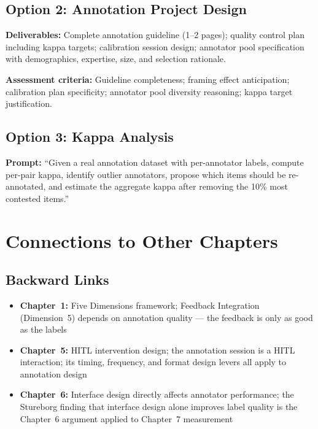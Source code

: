 \subsection{Option 2: Annotation Project Design}

\textbf{Deliverables:} Complete annotation guideline (1--2 pages); quality control plan including kappa targets; calibration session design; annotator pool specification with demographics, expertise, size, and selection rationale.

\textbf{Assessment criteria:} Guideline completeness; framing effect anticipation; calibration plan specificity; annotator pool diversity reasoning; kappa target justification.

\subsection{Option 3: Kappa Analysis}

\textbf{Prompt:} ``Given a real annotation dataset with per-annotator labels, compute per-pair kappa, identify outlier annotators, propose which items should be re-annotated, and estimate the aggregate kappa after removing the 10\% most contested items.''

\section{Connections to Other Chapters}

\subsection{Backward Links}
\begin{itemize}
    \item \textbf{Chapter~1:} Five Dimensions framework; Feedback Integration (Dimension~5) depends on annotation quality --- the feedback is only as good as the labels
    \item \textbf{Chapter~5:} HITL intervention design; the annotation session is a HITL interaction; its timing, frequency, and format design levers all apply to annotation design
    \item \textbf{Chapter~6:} Interface design directly affects annotator performance; the Stureborg finding that interface design alone improves label quality is the Chapter~6 argument applied to Chapter~7 measurement
\end{itemize}

